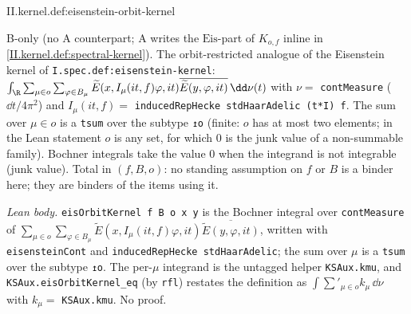 \begin{definition}
\bonly
{}
\end{definition}
\begin{tfformal}{II.kernel.def:eisenstein-orbit-kernel}
\begin{tffidelity}
B-only (no A counterpart; A writes the $\mathrm{Eis}$-part of $K_{o,f}$ inline in \cref{II.kernel.def:spectral-kernel}). The orbit-restricted analogue of the Eisenstein kernel of \texttt{I.spec.def:eisenstein-kernel}: $\int_{\R}\sum_{\mu\in o}\sum_{\varphi\in B_\mu}\widetilde E(x,I_\mu(it,f)\varphi,it)\overline{\widetilde E(y,\varphi,it)}\,\dd\nu(t)$ with $\nu=$ \texttt{contMeasure} ($\dd t/4\pi^2$) and $I_\mu(it,f)=$ \texttt{inducedRepHecke stdHaarAdelic (t*I) f}. The sum over $\mu\in o$ is a \texttt{tsum} over the subtype \texttt{↥o} (finite: $o$ has at most two elements; in the Lean statement $o$ is any set, for which $0$ is the junk value of a non-summable family). Bochner integrals take the value $0$ when the integrand is not integrable (junk value). Total in $(f,B,o)$: no standing assumption on $f$ or $B$ is a binder here; they are binders of the items using it.
\end{tffidelity}
\end{tfformal}
\noindent\emph{Lean body.} \texttt{eisOrbitKernel f B o x y} is the Bochner integral over \texttt{contMeasure} of $\sum_{\mu\in o}\sum_{\varphi\in B_\mu}\widetilde E(x,I_\mu(it,f)\varphi,it)\overline{\widetilde E(y,\varphi,it)}$, written with \texttt{eisensteinCont} and \texttt{inducedRepHecke stdHaarAdelic}; the sum over $\mu$ is a \texttt{tsum} over the subtype \texttt{↥o}. The per-$\mu$ integrand is the untagged helper \texttt{KSAux.kmu}, and \texttt{KSAux.eisOrbitKernel\_eq} (by \texttt{rfl}) restates the definition as $\int\sum'_{\mu\in o}k_\mu\,\dd\nu$ with $k_\mu=$ \texttt{KSAux.kmu}. No proof.

